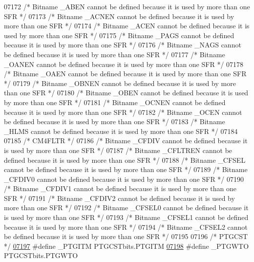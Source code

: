 \begin{DoxyCode}
07172 \textcolor{comment}{/* Bitname \_ABEN cannot be defined because it is used by more than one SFR */}
07173 \textcolor{comment}{/* Bitname \_ACNEN cannot be defined because it is used by more than one SFR */}
07174 \textcolor{comment}{/* Bitname \_ACEN cannot be defined because it is used by more than one SFR */}
07175 \textcolor{comment}{/* Bitname \_PAGS cannot be defined because it is used by more than one SFR */}
07176 \textcolor{comment}{/* Bitname \_NAGS cannot be defined because it is used by more than one SFR */}
07177 \textcolor{comment}{/* Bitname \_OANEN cannot be defined because it is used by more than one SFR */}
07178 \textcolor{comment}{/* Bitname \_OAEN cannot be defined because it is used by more than one SFR */}
07179 \textcolor{comment}{/* Bitname \_OBNEN cannot be defined because it is used by more than one SFR */}
07180 \textcolor{comment}{/* Bitname \_OBEN cannot be defined because it is used by more than one SFR */}
07181 \textcolor{comment}{/* Bitname \_OCNEN cannot be defined because it is used by more than one SFR */}
07182 \textcolor{comment}{/* Bitname \_OCEN cannot be defined because it is used by more than one SFR */}
07183 \textcolor{comment}{/* Bitname \_HLMS cannot be defined because it is used by more than one SFR */}
07184 
07185 \textcolor{comment}{/* CM4FLTR */}
07186 \textcolor{comment}{/* Bitname \_CFDIV cannot be defined because it is used by more than one SFR */}
07187 \textcolor{comment}{/* Bitname \_CFLTREN cannot be defined because it is used by more than one SFR */}
07188 \textcolor{comment}{/* Bitname \_CFSEL cannot be defined because it is used by more than one SFR */}
07189 \textcolor{comment}{/* Bitname \_CFDIV0 cannot be defined because it is used by more than one SFR */}
07190 \textcolor{comment}{/* Bitname \_CFDIV1 cannot be defined because it is used by more than one SFR */}
07191 \textcolor{comment}{/* Bitname \_CFDIV2 cannot be defined because it is used by more than one SFR */}
07192 \textcolor{comment}{/* Bitname \_CFSEL0 cannot be defined because it is used by more than one SFR */}
07193 \textcolor{comment}{/* Bitname \_CFSEL1 cannot be defined because it is used by more than one SFR */}
07194 \textcolor{comment}{/* Bitname \_CFSEL2 cannot be defined because it is used by more than one SFR */}
07195 
07196 \textcolor{comment}{/* PTGCST */}
\hypertarget{a00009_source_l07197}{}\hyperlink{a00009_a389f6f3b11bc8474e69b3e1a495faeaa}{07197} \textcolor{preprocessor}{#define \_PTGITM PTGCSTbits.PTGITM}
\hypertarget{a00009_source_l07198}{}\hyperlink{a00009_a17c86f13a7471cf011048de7051ef3d6}{07198} \textcolor{preprocessor}{#define \_PTGWTO PTGCSTbits.PTGWTO}

\end{DoxyCode}
